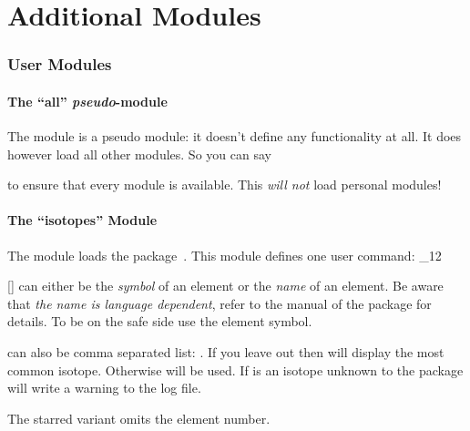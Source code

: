 \documentclass[load-preamble+]{cnltx-doc}
\makeatletter
\def\chemmodule*#1{\textquotedblleft#1\textquotedblright}%
\renewenvironment{commands}
  {%
    \cnltx@set@catcode_{12}%
    \let\command\cnltx@command
    \cnltxlist
  }
  {\endcnltxlist}
\makeatother
\begin{document}
\clearpage

\part{Additional Modules}\label{part:additional-modules}

\section{User Modules}
\subsection{The \chemmodule*{all} \emph{pseudo}-module}\label{sec:all-module}

The  module is a pseudo module: it doesn't define any
functionality at all.  It does however load all other modules.  So you can say
\begin{sourcecode}
\end{sourcecode}
to ensure that every module is available.  This \emph{will not} load personal
modules!

\subsection{The \chemmodule*{isotopes} Module}\label{sec:isotopes-module}

The  module loads the 
package~\cite{pkg:elements}.  This module defines one user command:
\begin{commands}
  \command{isotope}[\sarg{}]
     can either be the \emph{symbol} of an element or the
    \emph{name} of an element.  Be aware that \emph{the name is language
      dependent}, refer to the manual of the  package for
    details.  To be on the safe side use the element symbol.

     can also be comma separated list:
    .  If you leave  out
    then  will display the most common isotope.  Otherwise
     will be used.  If  is an isotope unknown to the
     package  will write a warning to the log file.

    The starred variant omits the element number.
\end{commands}

\begin{example}
\end{example}
\end{document}
